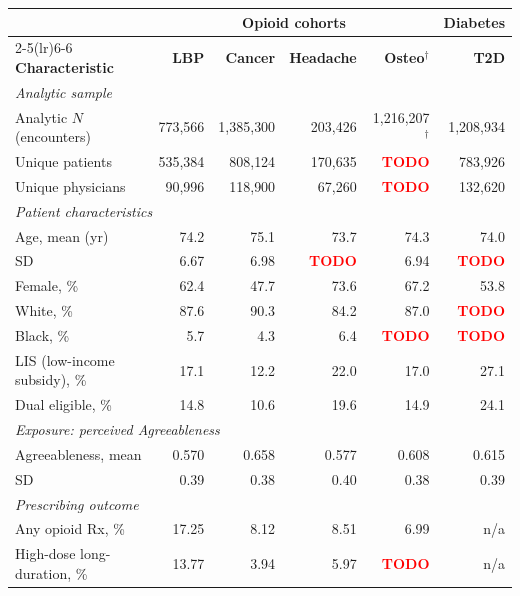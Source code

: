 \begin{tabular}{l rrrr r}
\toprule
 & \multicolumn{4}{c}{\textbf{Opioid cohorts}} & \textbf{Diabetes} \\
\cmidrule(lr){2-5}\cmidrule(lr){6-6}
\textbf{Characteristic} & \textbf{LBP} & \textbf{Cancer} & \textbf{Headache} & \textbf{Osteo$^{\dagger}$} & \textbf{T2D} \\
\midrule
\multicolumn{6}{l}{\textit{Analytic sample}} \\
Analytic $N$ (encounters)      & 773{,}566 & 1{,}385{,}300 & 203{,}426 & 1{,}216{,}207$^{\dagger}$ & 1{,}208{,}934 \\
\quad Unique patients          & 535{,}384 & 808{,}124 & 170{,}635 & \textcolor{red}{\textbf{TODO}} & 783{,}926 \\
\quad Unique physicians        & 90{,}996 & 118{,}900 & 67{,}260 & \textcolor{red}{\textbf{TODO}} & 132{,}620 \\[4pt]
\multicolumn{6}{l}{\textit{Patient characteristics}} \\
Age, mean (yr)                 & 74.2 & 75.1 & 73.7 & 74.3 & 74.0 \\
\quad SD                       & 6.67 & 6.98 & \textcolor{red}{\textbf{TODO}} & 6.94 & \textcolor{red}{\textbf{TODO}} \\
Female, \%                     & 62.4 & 47.7 & 73.6 & 67.2 & 53.8 \\
White, \%                      & 87.6 & 90.3 & 84.2 & 87.0 & \textcolor{red}{\textbf{TODO}} \\
Black, \%                      & 5.7 & 4.3 & 6.4 & \textcolor{red}{\textbf{TODO}} & \textcolor{red}{\textbf{TODO}} \\
LIS (low-income subsidy), \%   & 17.1 & 12.2 & 22.0 & 17.0 & 27.1 \\
Dual eligible, \%              & 14.8 & 10.6 & 19.6 & 14.9 & 24.1 \\[4pt]
\multicolumn{6}{l}{\textit{Exposure: perceived Agreeableness}} \\
Agreeableness, mean            & 0.570 & 0.658 & 0.577 & 0.608 & 0.615 \\
\quad SD                       & 0.39 & 0.38 & 0.40 & 0.38 & 0.39 \\[4pt]
\multicolumn{6}{l}{\textit{Prescribing outcome}} \\
Any opioid Rx, \%              & 17.25 & 8.12 & 8.51 & 6.99 & n/a \\
\quad High-dose long-duration, \% & 13.77 & 3.94 & 5.97 & \textcolor{red}{\textbf{TODO}} & n/a \\

\end{tabular}

